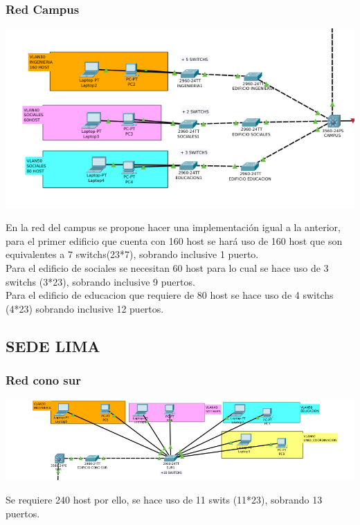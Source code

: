 \subsubsection{Red Campus}
\includegraphics[scale=0.54]{img/CAMPUS.png} 
\begin{definicion}[]
{
En la red del campus se propone hacer una implementaci\'on igual a la anterior, para el primer edificio que cuenta con 160 host se har\'a uso de 160 host que son equivalentes a 7 switchs(23*7), sobrando inclusive 1 puerto.
\\
Para el edificio de sociales se necesitan 60 host para lo cual se hace uso de 3 switchs (3*23), sobrando inclusive 9 puertos.
\\
Para el edificio de educacion que requiere de 80 host se hace uso de 4 switchs (4*23) sobrando inclusive 12 puertos.
}
\end{definicion}




\subsection{SEDE LIMA}
\subsubsection{Red cono sur}
\includegraphics[scale=0.48]{img/CONOSUR.png} 
\begin{definicion}[]
{
Se requiere 240 host por ello, se hace uso de 11 swits (11*23), sobrando 13 puertos.
}
\end{definicion}


